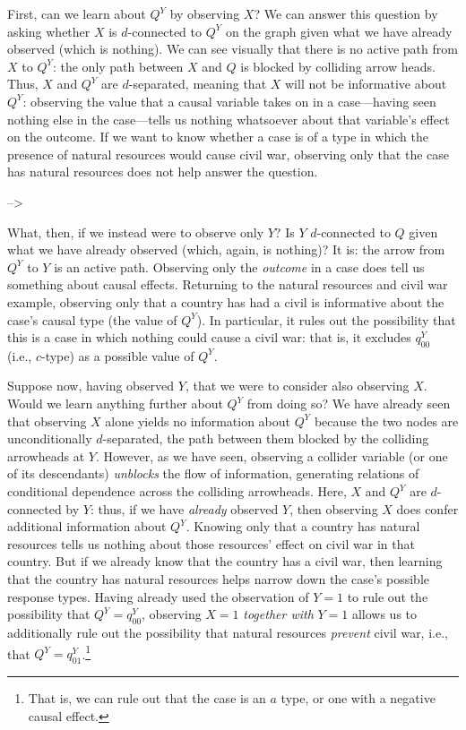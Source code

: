 \documentclass[12pt,]{book}
\let\rmarkdownfootnote\footnote%
\def\footnote{\protect\rmarkdownfootnote}
\begin{document}
First, can we learn about \(Q^Y\) by observing \(X\)? We can answer this question by asking whether \(X\) is \(d\)-connected to \(Q^Y\) on the graph given what we have already observed (which is nothing). We can see visually that there is no active path from \(X\) to \(Q^Y\): the only path between \(X\) and \(Q\) is blocked by colliding arrow heads. Thus, \(X\) and \(Q^Y\) are \(d\)-separated, meaning that \(X\) will not be informative about \(Q^Y\): observing the value that a causal variable takes on in a case---having seen nothing else in the case---tells us nothing whatsoever about that variable's effect on the outcome. If we want to know whether a case is of a type in which the presence of natural resources would cause civil war, observing only that the case has natural resources does not help answer the question.

--\textgreater{}

What, then, if we instead were to observe only \(Y\)? Is \(Y\) \(d\)-connected to \(Q\) given what we have already observed (which, again, is nothing)? It is: the arrow from \(Q^Y\) to \(Y\) is an active path. Observing only the \emph{outcome} in a case does tell us something about causal effects. Returning to the natural resources and civil war example, observing only that a country has had a civil is informative about the case's causal type (the value of \(Q^Y\)). In particular, it rules out the possibility that this is a case in which nothing could cause a civil war: that is, it excludes \(q^Y_{00}\) (i.e., \(c\)-type) as a possible value of \(Q^Y\).

Suppose now, having observed \(Y\), that we were to consider also observing \(X\). Would we learn anything further about \(Q^Y\) from doing so? We have already seen that observing \(X\) alone yields no information about \(Q^Y\) because the two nodes are unconditionally \(d\)-separated, the path between them blocked by the colliding arrowheads at \(Y\). However, as we have seen, observing a collider variable (or one of its descendants) \emph{unblocks} the flow of information, generating relations of conditional dependence across the colliding arrowheads. Here, \(X\) and \(Q^Y\) are \(d\)-connected by \(Y\): thus, if we have \emph{already} observed \(Y\), then observing \(X\) does confer additional information about \(Q^Y\). Knowing only that a country has natural resources tells us nothing about those resources' effect on civil war in that country. But if we already know that the country has a civil war, then learning that the country has natural resources helps narrow down the case's possible response types. Having already used the observation of \(Y=1\) to rule out the possibility that \(Q^Y=q^Y_{00}\), observing \(X=1\) \emph{together with} \(Y=1\) allows us to additionally rule out the possibility that natural resources \emph{prevent} civil war, i.e., that \(Q^Y=q^Y_{01}\).\footnote{That is, we can rule out that the case is an \(a\) type, or one with a negative causal effect.}
\end{document}
